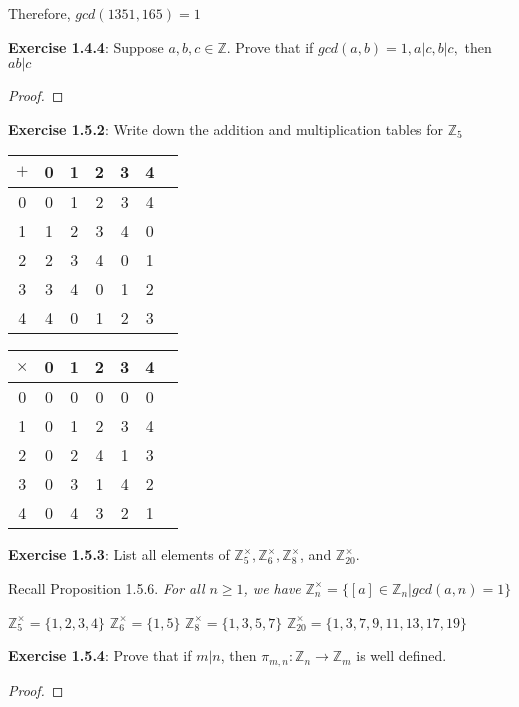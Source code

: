\documentclass[a4paper]{article}
\begin{document}
\begin{myparindent}{0pt}
Therefore, $gcd(1351, 165) = 1$ \newline
\newline

\textbf{Exercise 1.4.4}:
Suppose $a, b, c \in \mathbb{Z}$. Prove that if $gcd(a, b) = 1, a|c, b|c,$ then $ab|c$
\begin{proof}
\end{proof}

\textbf{Exercise 1.5.2}:
Write down the addition and multiplication tables for $\mathbb{Z}_5$ \newline

\begin{center}
\begin{tabular}{ c| c | c | c | c | c | c |}
$+$ & 0 & 1 & 2 & 3 & 4 \\
\hline
0 & 0 & 1 & 2 & 3 & 4 \\
\hline
1 & 1 & 2 & 3 & 4 & 0 \\
\hline
2 & 2 & 3 & 4 & 0 & 1 \\
\hline
3 & 3 & 4 & 0 & 1 & 2 \\
\hline
4 & 4 & 0 & 1 & 2 & 3 \\
\hline
\end{tabular}
\end{center}

\begin{center}
\begin{tabular}{ c| c | c | c | c | c | c |}
$\times$ & 0 & 1 & 2 & 3 & 4 \\
\hline
0 & 0 & 0 & 0 & 0 & 0 \\
\hline
1 & 0 & 1 & 2 & 3 & 4 \\
\hline
2 & 0 & 2 & 4 & 1 & 3 \\
\hline
3 & 0 & 3 & 1 & 4 & 2 \\
\hline
4 & 0 & 4 & 3 & 2 & 1 \\
\hline
\end{tabular}
\end{center}

\textbf{Exercise 1.5.3}:
List all elements of $\mathbb{Z}_5^\times, \mathbb{Z}_6^\times, \mathbb{Z}_8^\times$, and $\mathbb{Z}_{20}^\times$.
\newline

Recall Proposition 1.5.6. \textit{For all $n \ge 1$, we have} $\mathbb{Z}_n^\times = \{ [a] \in \mathbb{Z}_n | gcd(a, n) = 1 \}$ \newline

$\mathbb{Z}_5^\times = \{ 1, 2, 3, 4 \}$ \newline
$\mathbb{Z}_6^\times = \{ 1, 5 \}$ \newline
$\mathbb{Z}_8^\times = \{ 1, 3, 5, 7 \}$ \newline
$\mathbb{Z}_{20}^\times = \{ 1, 3, 7, 9, 11, 13, 17, 19 \}$ \newline
\newline

\textbf{Exercise 1.5.4}:
Prove that if $m|n$, then $\pi_{m, n}: \mathbb{Z}_n \rightarrow \mathbb{Z}_m$ is well defined.

\begin{proof}
\end{proof}

\end{myparindent}
\end{document}
